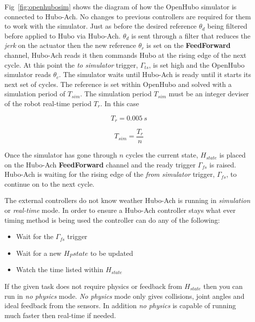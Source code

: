 Fig~\ref{fig:openhubosim} shows the diagram of how the OpenHubo simulator is connected to Hubo-Ach.  
No changes to previous controllers are required for them to work with the simulator.
Just as before the desired reference $\theta_d$ being filtered before applied to Hubo via Hubo-Ach.  
$\theta_d$ is sent through a filter that reduces the \textit{jerk} on the actuator then the new reference $\theta_r$ is set on the \textbf{FeedForward} channel, Hubo-Ach reads it then commands Hubo at the rising edge of the next cycle.  
At this point the \textit{to simulator} trigger, $\Gamma_{ts}$, is set high and the OpenHubo simulator reads $\theta_c$.
The simulator waits until Hubo-Ach is ready until it starts its next set of cycles.
The reference is set within OpenHubo and solved with a simulation period of $T_{sim}$.
The simulation period $T_{sim}$ must be an integer deviser of the robot real-time period $T_r$.
In this case

\begin{equation}
T_r=0.005~s
\end{equation}

\begin{equation}
T_{sim} = \frac{T_r}{n}
\end{equation}


Once the simulator has gone through $n$ cycles the current state, $H_{state}$ is placed on the Hubo-Ach \textbf{FeedForward} channel and the ready trigger $\Gamma_{fs}$ is raised.  
Hubo-Ach is waiting for the rising edge of the \textit{from simulator} trigger, $\Gamma_{fs}$, to continue on to the next cycle.




The external controllers do not know weather Hubo-Ach is running in \textit{simulation} or \textit{real-time} mode.  
In order to ensure a Hubo-Ach controller stays what ever timing method is being used the controller can do any of the following:

\begin{itemize}
\item Wait for the $\Gamma_{fs}$ trigger
\item Wait for a new $H_P{state}$ to be updated
\item Watch the time listed within $H_{state}$
\end{itemize}

If the given task does not require physics or feedback from $H_{state}$ then you can run in \textit{no physics} mode.
\textit{No physics} mode only gives collisions, joint angles and ideal feedback from the sensors.
In addition \textit{no physics} is capable of running much faster then real-time if needed.



